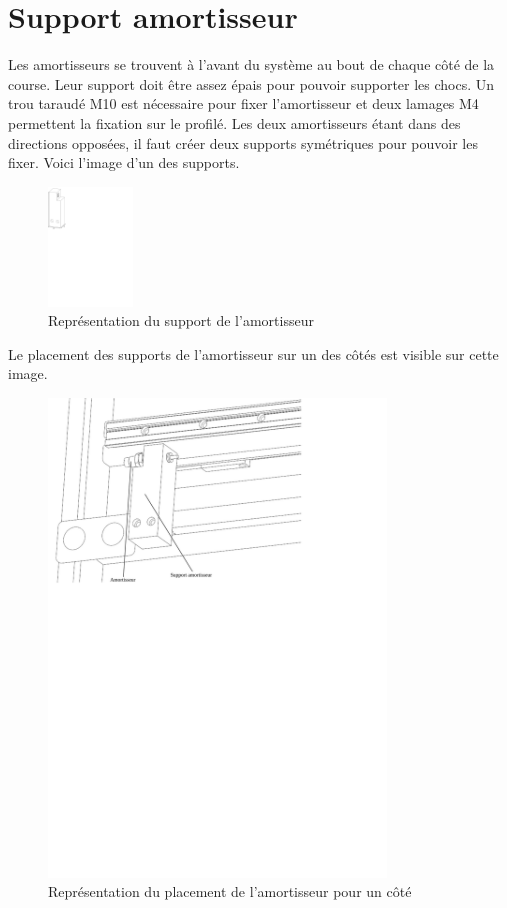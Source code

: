 \section{Support amortisseur}\label{sec:SupAmort}
Les amortisseurs se trouvent à l'avant du système au bout de chaque côté de la course. Leur support doit être assez épais pour pouvoir supporter
les chocs. Un trou taraudé M10 est nécessaire pour fixer l'amortisseur et deux lamages M4 permettent la fixation sur le profilé. Les deux amortisseurs
étant dans des directions opposées, il faut créer deux supports symétriques pour pouvoir les fixer. Voici l'image d'un des supports.

\begin{figure}[H]
    \centering
    \includegraphics[width = 0.2\textwidth]{assets/figures/SupportAmortisseur.svg}
    \caption{Représentation du support de l'amortisseur}
    \label{fig:SupAmort}
\end{figure}

Le placement des supports de l'amortisseur sur un des côtés est visible sur cette image.

\begin{figure}[H]
    \centering
    \includegraphics[width = 0.8\textwidth]{assets/figures/PlacementSupports.svg}
    \caption{Représentation du placement de l'amortisseur pour un côté}
    \label{fig:PlaceSup}
\end{figure}

